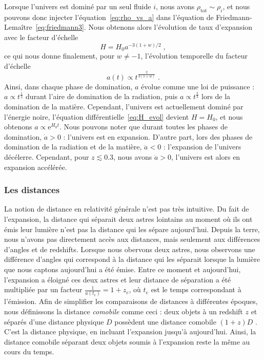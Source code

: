 Lorsque l'univers est dominé par un seul fluide $i$, nous avons $\rho_{\mathrm{tot}} \sim \rho_{i}$, et nous pouvons donc injecter l'équation~\ref{eq:rho_vs_a} dans l'équation de Friedmann-Lemaître~\ref{eq:friedmann3}. Nous obtenons alors l'évolution de taux d'expansion avec le facteur d'échelle
\begin{equation}
  \label{eq:H_evol}
  H = H_0 a^{-3 (1+w) / 2}  \; ,
\end{equation}
ce qui nous donne finalement, pour $w \neq -1$, l'évolution temporelle du facteur d'échelle
\begin{equation}
  \label{eq:a_vs_t}
  a(t) \propto t^{\frac{2}{3(1+w)}}  \; .
\end{equation}
Ainsi, dans chaque phase de domination, $a$ évolue comme une loi de puissance : $a \propto t^{\frac{1}{2}}$ durant l'aire de domination de la radiation, puis $a \propto t^{\frac{2}{3}}$ lors de la domination de la matière. Cependant, l'univers est actuellement dominé par l'énergie noire, l'équation différentielle~\ref{eq:H_evol} devient $H = H_0$, et nous obtenons $a \propto \mathrm{e}^{H_{0} t}$. Nous pouvons noter que durant toutes les phases de domination, $\dot a > 0$ : l'univers est en expansion. D'autre part, lors des phases de domination de la radiation et de la matière, $\ddot a < 0$ : l'expansion de l'univers décélerre. Cependant, pour $ z \lesssim \num{0.3}$, nous avons $\ddot a > 0$, l'univers est alors en expansion accélérée.

\subsubsection{Les distances}
La notion de distance en relativité générale n'est pas très intuitive.
Du fait de l'expansion, la distance qui séparait deux astres lointains au moment où ils ont émis leur lumière n'est pas la distance qui les sépare aujourd'hui.
Depuis la terre, nous n'avons pas directement accès aux distances, mais seulement aux différences d'angles et de redshifts.
Lorsque nous obervons deux astres, nous observons une différence d'angles qui correspond à la distance qui les séparait lorsque la lumière que nous captons aujourd'hui a été émise. 
Entre ce moment et aujourd'hui, l'expansion a éloigné ces deux astres et leur distance de séparation a été multipliée par un facteur $\frac{1}{a(t_e)} = 1 + z_{e}$, où $t_e$ est le temps correspondant à l'émission.
Afin de simplifier les comparaisons de distances à différentes époques, nous définissons la distance \emph{comobile} comme ceci : deux objets à un redshift $z$ et séparés d'une distance physique $D$ possèdent une distance comobile $(1+z)D$ . C'est la distance physique, en incluant l'expansion jusqu'à aujourd'hui. Ainsi, la distance comobile séparant deux objets soumis à l'expansion reste la même au cours du temps.

